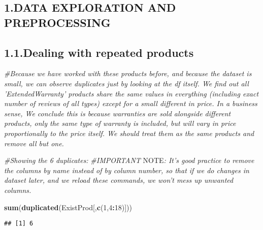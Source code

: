 \documentclass[]{article}
\newenvironment{Shaded}{\begin{snugshade}}{\end{snugshade}}
\newcommand{\AlertTok}[1]{\textcolor[rgb]{0.94,0.16,0.16}{#1}}
\newcommand{\CommentTok}[1]{\textcolor[rgb]{0.56,0.35,0.01}{\textit{#1}}}
\newcommand{\DecValTok}[1]{\textcolor[rgb]{0.00,0.00,0.81}{#1}}
\newcommand{\KeywordTok}[1]{\textcolor[rgb]{0.13,0.29,0.53}{\textbf{#1}}}
\newcommand{\NormalTok}[1]{#1}
\newcommand{\OperatorTok}[1]{\textcolor[rgb]{0.81,0.36,0.00}{\textbf{#1}}}
\begin{document}
\hypertarget{data-exploration-and-preprocessing}{%
\subsection{1.DATA EXPLORATION AND
PREPROCESSING}\label{data-exploration-and-preprocessing}}

\hypertarget{dealing-with-repeated-products}{%
\subsection{1.1.Dealing with repeated
products}\label{dealing-with-repeated-products}}

\begin{Shaded}
\begin{Highlighting}[]
\CommentTok{#Because we have worked with these products before, and because the dataset is small, we can observe duplicates just by looking at the df itself. We find out all 'ExtendedWarranty' products share the same values in everything (including exact number of reviews of all types) except for a small different in price. In a business sense, We conclude this is because warranties are sold alongside different products, only the same type of warranty is included, but will vary in price proportionally to the price itself. We should treat them as the same products and remove all but one.}

\CommentTok{#Showing the 6 duplicates:}
\CommentTok{#IMPORTANT }\AlertTok{NOTE}\CommentTok{: It's good practice to remove the columns by name instead of by column number, so that if we do changes in dataset later, and we reload these commands, we won't mess up unwanted columns.}

\KeywordTok{sum}\NormalTok{(}\KeywordTok{duplicated}\NormalTok{(ExistProd[,}\KeywordTok{c}\NormalTok{(}\DecValTok{1}\NormalTok{,}\DecValTok{4}\OperatorTok{:}\DecValTok{18}\NormalTok{)]))}
\end{Highlighting}
\end{Shaded}

\begin{verbatim}
## [1] 6
\end{verbatim}
\end{document}
